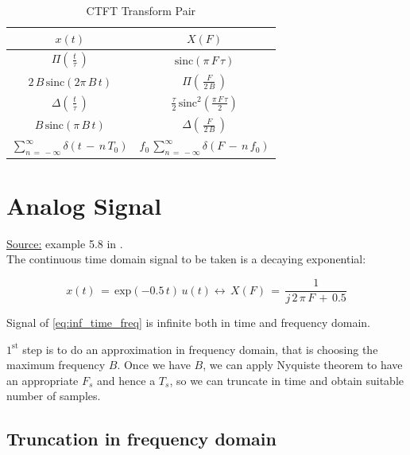 \begin{table}[!h]
	\centering
\begin{tabular}{|c|c|} \hline
$x(t)$  & $X(F)$ \\ \hline 
$\Pi\displaystyle \left( \, \frac{t}{\tau} \,\right)$ & $\text{sinc} (\pi \, F \, \tau)$ \\ \hline
$2\, B \, \text{sinc}(2 \pi \, B \, t)$ & $\Pi\displaystyle \left( \, \frac{F}{2 \, B} \,\right) $\\ \hline
$\Delta\displaystyle \left( \, \frac{t}{\tau} \,\right)$ & $ \displaystyle\frac{\tau}{2} \, \text{sinc}^2 \left( \displaystyle\frac{\pi \, F \, \tau}{2}   \right)$ \\ \hline
$ B \, \text{sinc}(\pi \, B \, t)$ & $\Delta\displaystyle \left( \, \frac{F}{2 \, B} \,\right) $\\ \hline
 $\displaystyle\sum_{n \, = \, - \infty}^\infty \delta(t \, - \, n \, T_0)$ & $ f_0 \, \displaystyle\sum_{n \, = \, - \infty}^\infty \delta(F \, - \, n \, f_0)$ \\ \hline
\end{tabular}
\caption{CTFT Transform Pair}
\label{Tb:Fourier_Processing:CTFT_Table}
\end{table} 

\newpage
\section{Analog Signal}

\underline{Source:} example 5.8 in \cite{signal_processing_Lathi}.\\

The continuous time domain signal to be taken is a decaying exponential:

\begin{equation}
x(t) \, = \, \text{exp}(-0.5 \, t) \, u(t) \leftrightarrow \, X(F) \, = \, \displaystyle\frac{1}{j \, 2\, \pi \, F \, + \, 0.5}
\label{eq:inf_time_freq}
\end{equation}

Signal of \autoref{eq:inf_time_freq} is infinite both in time and frequency domain.

$\mathrm{1}^\mathrm{st}$ step is to do an approximation in frequency domain, that is choosing the maximum frequency $B$. Once we have $B$, we can apply Nyquiste theorem to have an appropriate $F_s$ and hence a $T_s$, so we can truncate in time and obtain suitable number of samples.


\subsection{Truncation in frequency domain}

